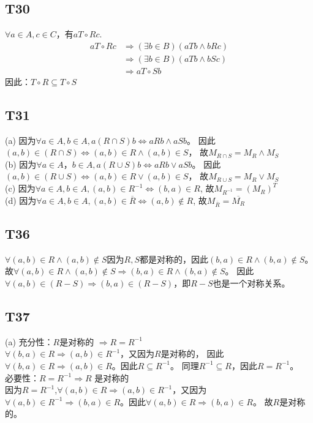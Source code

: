 \documentclass{article}
\begin{document}
\subsection{T30}
$\forall a \in A, c \in C$，有$a T \circ R c$.
\begin{align*}
    a T \circ R c &\Rightarrow (\exists b \in B)(aTb \land bRc)\\
    &\Rightarrow (\exists b \in B)(aTb \land bSc)\\
    &\Rightarrow a T \circ S b
\end{align*}因此：$T \circ R \subseteq T \circ S$
\subsection{T31}
(a) 因为$\forall a \in A, b \in A, a(R \cap S)b \Leftrightarrow aRb \land aSb$。
因此$(a, b) \in (R \cap S) \Leftrightarrow (a, b) \in R \land (a, b) \in S$，
故$M_{R\cap S} = M_R \land M_S$\\
(b) 因为$\forall a \in A， b \in A, a(R \cup S)b \Leftrightarrow aRb \lor aSb$。
因此$(a, b) \in (R \cup S) \Leftrightarrow (a, b) \in R \lor (a, b) \in S$，
故$M_{R \cup S} = M_R \lor M_S$\\
(c) 因为$\forall a \in A, b \in A, (a, b) \in R^{-1} \Leftrightarrow (b, a) \in R$,
故$M_{R^{-1}} = (M_R)^T$\\
(d) 因为$\forall a \in A, b \in A, (a, b) \in \overline{R} \Leftrightarrow (a, b) \notin R$,
故$M_{\overline{R}} = \overline{M_R}$
\subsection{T36}
$\forall (a, b) \in R \land (a, b) \notin S$因为$R,S$都是对称的，因此$(b, a) \in R \land (b, a) \notin S$。
故$\forall (a, b) \in R \land (a, b) \notin S \Rightarrow (b, a) \in R \land (b, a) \notin S$。
因此$\forall (a, b) \in (R - S) \Rightarrow (b, a) \in (R - S)$，即$R - S$也是一个对称关系。
\subsection{T37}
(a) 充分性：$R$是对称的 $\Rightarrow R = R^{-1}$\\
$\forall (b, a) \in R \Rightarrow (a, b) \in R^{-1}$，又因为$R$是对称的，
因此$\forall (b, a) \in R \Rightarrow (a, b) \in R$。因此$R \subseteq R^{-1}$。
同理$R^{-1} \subseteq R$，因此$R = R^{-1}$。\\
必要性：$R = R^{-1} \Rightarrow R$ 是对称的\\
因为$R = R^{-1}$,$\forall (a, b) \in R \Rightarrow (a, b) \in R^{-1}$，又因为
$\forall (a, b) \in R^{-1} \Rightarrow (b, a) \in R$。因此$\forall (a, b) \in R \Rightarrow (b, a) \in R$。
故$R$是对称的。
\end{document}
